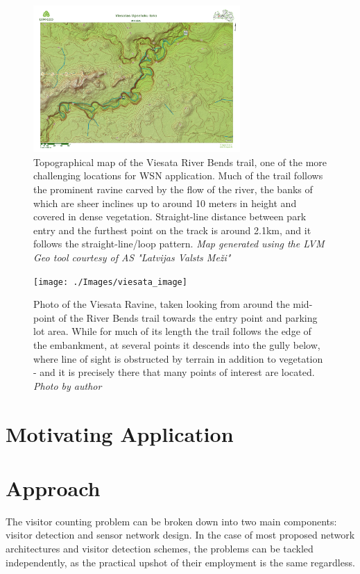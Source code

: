 \documentclass[10pt,nocopyrightspace]{ewsn-proc}
\begin{document}
\begin{figure}[t!]
\centering
\includegraphics[height=2.2in]{./Images/map1-Viesata}
	\caption{Topographical map of the Viesata River Bends trail, one of the more challenging locations for WSN application. Much of the trail follows the prominent ravine carved by the flow of the river, the banks of which are sheer inclines up to around 10 meters in height and covered in dense vegetation. Straight-line distance between park entry and the furthest point on the track is around 2.1km, and it follows the straight-line/loop pattern. \textit{Map generated using the LVM Geo tool courtesy of AS "Latvijas Valsts Meži"}}
\end{figure}

\begin{figure}[t!]
\centering
\texttt{[image: ./Images/viesata\_image]}
	\caption{Photo of the Viesata Ravine, taken looking from around the mid-point of the River Bends trail towards the entry point and parking lot area. While for much of its length the trail follows the edge of the embankment, at several points it descends into the gully below, where line of sight is obstructed by terrain in addition to vegetation - and it is precisely there that many points of interest are located. \textit{Photo by author}}
\end{figure}


\section{Motivating Application}

\section{Approach}
The visitor counting problem can be broken down into two main components: visitor detection and sensor network design. In the case of most proposed network architectures and visitor detection schemes, the problems can be tackled independently, as the practical upshot of their employment is the same regardless.
\end{document}
